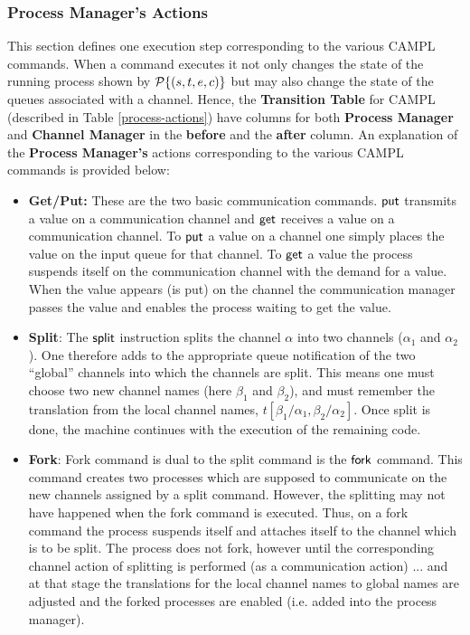 \documentclass[11pt]{article}
\newcommand{\<}{\langle}
\renewcommand{\>}{\rangle}
\begin{document}
\subsubsection{Process Manager's Actions}{\label{process-manager}}
This section defines one execution step corresponding to the various CAMPL commands. When a command executes it not only changes the state of the running process shown by ${\cal P}\{ (s,t,e,c)\}$ but may also change the state of the queues associated with a channel. Hence, the {\bf Transition Table} for CAMPL (described in Table \ref {process-actions}) have columns for both {\bf Process Manager} and {\bf Channel Manager} in the {\bf before} and the {\bf after} column.
An explanation of the {\bf Process Manager's} actions corresponding to the various CAMPL commands is provided below:
\begin{itemize}
\item {\bf Get/Put:} These are the two basic communication commands. ${\sf put}$ transmits a value on a communication channel and ${\sf get}$ receives a value on a communication channel.  To ${\sf put}$ a value on a channel one simply 
places the value on the input queue for that channel. To ${\sf get}$ a value the process suspends itself on the communication channel with the demand for a value.   When the value appears (is put) on the channel the communication manager  
passes the value and enables the process waiting to get the value.

\item {\bf Split}: The ${\sf split}$ instruction splits the channel $\alpha$ into two channels ($\alpha_1$ and $\alpha_2$).  One therefore adds to the appropriate queue notification of the two ``global'' channels into which the channels are split. This means one must choose two new channel names (here $\beta_1$ and $\beta_2$), and must remember the translation from the local channel names, $t[\beta_1/\alpha_1,\beta_2/\alpha_2]$. Once {\sf split} is done, the machine continues with the execution of the remaining code.    

\item {\bf Fork}: {\sf Fork} command is dual to the {\sf split} command is the ${\sf fork}$ command.  This command creates two processes which are supposed to communicate on the new channels assigned by a  split command. However, the splitting may not have happened when the fork command is executed. Thus, on a fork command the process suspends itself and attaches itself to the channel which is to be split. The process does not fork, however 
until the corresponding channel action of splitting is performed (as a communication action)  ... and at that stage the translations for the local channel names to global names are adjusted and the forked processes are 
enabled (i.e. added into the process manager).


\end{itemize}
\end{document}
